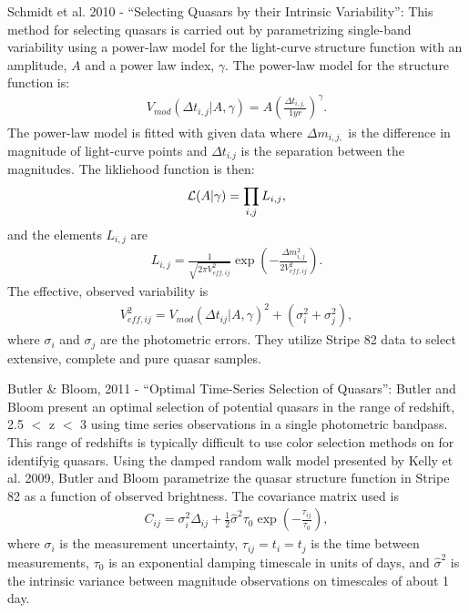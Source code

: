 \documentclass[letterpaper,12pt,preprint]{aastex}
\begin{document}
Schmidt et al. 2010 - ``Selecting Quasars by their Intrinsic
Variability'': This method for selecting quasars is carried out by
parametrizing single-band variability using a power-law model for the
light-curve structure function with an amplitude, $A$ and a power law
index, $\gamma$. The power-law model for the structure function is:
\begin{eqnarray}
V_{mod}(\Delta t_{i,j}|A,\gamma)=A\left(\frac{\Delta t_{i,j,}}{1
  yr}\right)^{\gamma}.
\end {eqnarray}
The power-law model is fitted with given data where $\Delta m_{i,j,}$
is the difference in magnitude of light-curve points and $\Delta
t_{i.j}$ is the separation between the magnitudes. The likliehood
function is then:
\begin{eqnarray}
{\cal L}(A|\gamma)= \prod_{i,j} L_{i,j},
\end{eqnarray}
and the elements $L_{i,j}$ are
\begin{eqnarray}
L_{i,j}=\frac{1}{\sqrt{2\pi V_{eff,ij}^2}}\exp\left(-\frac{\Delta
  m_{i,j}^2}{2V_{eff,ij}^2} \right).
\end{eqnarray}
The effective, observed variability is
\begin{eqnarray}
V_{eff,ij}^2=V_{mod}(\Delta t_{ij}|A,\gamma)^2+ (\sigma_i^2 +
\sigma_j^2),
\end{eqnarray} 
where $\sigma_i$ and $\sigma_j$ are the photometric errors. They
utilize Stripe 82 data to select extensive, complete and pure quasar
samples.

Butler \& Bloom, 2011 - ``Optimal Time-Series Selection of Quasars'':
Butler and Bloom present an optimal selection of potential quasars in
the range of redshift, 2.5 $<$ z $<$ 3 using time series observations
in a single photometric bandpass. This range of redshifts is typically
difficult to use color selection methods on for identifyig
quasars. Using the damped random walk model presented by Kelly et
al. 2009, Butler and Bloom parametrize the quasar structure function
in Stripe 82 as a function of observed brightness. The covariance
matrix used is
\begin{eqnarray}
C_{ij}=\sigma_i^2 \Delta_{ij} + \frac{1}{2}\hat{\sigma}^2 \tau_0 \exp
\left(-\frac{\tau_{ij}}{\tau_0}\right),
\end{eqnarray}
where $\sigma_i$ is the measurement uncertainty, $\tau_{ij}=t_i=t_j$
is the time between measurements, $\tau_0$ is an exponential damping
timescale in units of days, and $\hat{\sigma}^2$ is the intrinsic
variance between magnitude observations on timescales of about 1 day.
\end{document}
